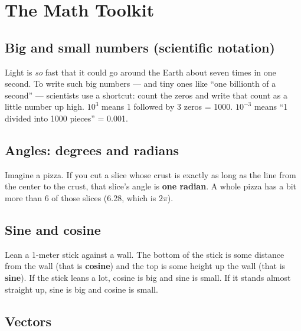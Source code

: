 \chapter{The Math Toolkit}

\section{Big and small numbers (scientific notation)}

\begin{kid}
Light is \emph{so} fast that it could go around the Earth about seven times in one second. To write such big numbers --- and tiny ones like ``one billionth of a second'' --- scientists use a shortcut: count the zeros and write that count as a little number up high. $10^3$ means 1 followed by 3 zeros = 1000. $10^{-3}$ means ``1 divided into 1000 pieces'' = 0.001.
\end{kid}

\section{Angles: degrees and radians}


\begin{kid}
Imagine a pizza. If you cut a slice whose crust is exactly as long as the line from the center to the crust, that slice's angle is \textbf{one radian}. A whole pizza has a bit more than 6 of those slices (6.28, which is $2\pi$).
\end{kid}

\section{Sine and cosine}


\begin{kid}
Lean a 1-meter stick against a wall. The bottom of the stick is some distance from the wall (that is \textbf{cosine}) and the top is some height up the wall (that is \textbf{sine}). If the stick leans a lot, cosine is big and sine is small. If it stands almost straight up, sine is big and cosine is small.
\end{kid}

\section{Vectors}

